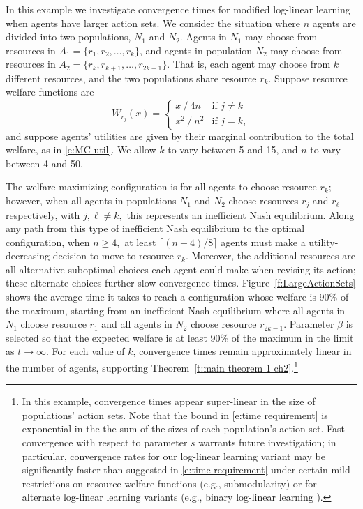 \begin{example}\label{s:large action sets}
In this example we investigate convergence times for modified log-linear learning when agents have larger action sets.   We consider the situation where $n$ agents are divided into two populations, $N_1$ and $N_2$. Agents in $N_1$ may choose from resources in $A_1 =\{r_1,r_2,\ldots,r_k\}$, and agents in population $N_2$ may choose from resources in $A_2 = \{r_k,r_{k+1}, \ldots, r_{2k-1}\}.$ That is, each agent may choose from $k$ different resources, and the two populations share resource $r_k$. Suppose resource welfare functions are
\begin{equation}\label{e:large action welfares}W_{r_j}(x) = 
\begin{cases}
x\mathop{/}4n  & \text{if } j\neq k\\
x^2\mathop{/}n^2 &\text{if } j=k,
\end{cases}
\end{equation}
and suppose agents' utilities are given by their marginal contribution to the total welfare, as in \eqref{e:MC util}. We allow $k$ to vary between 5 and 15, and $n$ to vary between 4 and 50. 

The welfare maximizing configuration is for all agents to choose resource $r_k$; however, when all agents in populations $N_1$ and $N_2$ choose resources $r_j$ and $r_{\ell}$ respectively, with $j,\ell\neq k,$ this represents an inefficient Nash equilibrium. Along any path from this type of inefficient Nash equilibrium to the optimal configuration, when $n\geq 4,$ at least $\lceil (n+4)/8\rceil$ agents must make a utility-decreasing decision to move to resource $r_k$. Moreover, the additional resources are all alternative suboptimal choices each agent could make when revising its action; these alternate choices further slow convergence times. Figure~\ref{f:LargeActionSets} shows the average time it takes to reach a configuration whose welfare is 90\% of the maximum, starting from an inefficient Nash equilibrium where all agents in $N_1$ choose resource $r_1$ and all agents in $N_2$ choose resource $r_{2k-1}.$ Parameter $\beta$ is selected so that the expected welfare is at least 90\% of the maximum in the limit as $t\to \infty.$ For each value of $k$, convergence times remain approximately linear in the number of agents, supporting Theorem~\ref{t:main theorem 1 ch2}.\footnote{In this example, convergence times appear super-linear in the size of populations' action sets. Note that the bound in \eqref{e:time requirement} is exponential in the the sum of the sizes of each population's action set.  Fast convergence with respect to parameter $s$ warrants future investigation; in particular, convergence rates for our log-linear learning variant may be significantly faster than suggested in \eqref{e:time requirement} under certain mild restrictions on resource welfare functions (e.g., submodularity) or for alternate log-linear learning variants (e.g., binary log-linear learning \cite{Arslan2007, Marden2007a}).}


\end{example}
